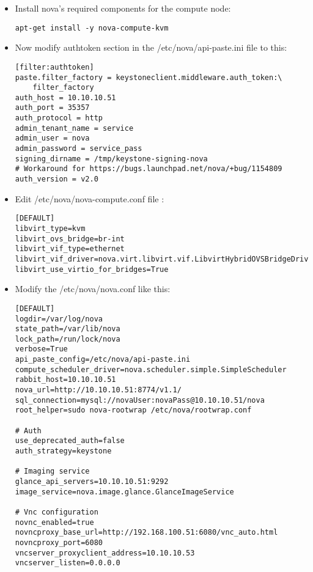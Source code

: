 \begin{itemize}
\item Install nova's required components for the compute node:

\begin{verbatim}
apt-get install -y nova-compute-kvm
\end{verbatim}


\item Now modify authtoken section in the \slash etc\slash nova\slash api-paste.ini file to this:

\begin{verbatim}
[filter:authtoken]
paste.filter_factory = keystoneclient.middleware.auth_token:\
    filter_factory
auth_host = 10.10.10.51
auth_port = 35357
auth_protocol = http
admin_tenant_name = service
admin_user = nova
admin_password = service_pass
signing_dirname = /tmp/keystone-signing-nova
# Workaround for https://bugs.launchpad.net/nova/+bug/1154809
auth_version = v2.0
\end{verbatim}


\item Edit \slash etc\slash nova\slash nova-compute.conf file :

\begin{verbatim}
[DEFAULT]
libvirt_type=kvm
libvirt_ovs_bridge=br-int
libvirt_vif_type=ethernet
libvirt_vif_driver=nova.virt.libvirt.vif.LibvirtHybridOVSBridgeDriver
libvirt_use_virtio_for_bridges=True
\end{verbatim}


\item Modify the \slash etc\slash nova\slash nova.conf like this:

\begin{verbatim}
[DEFAULT] 
logdir=/var/log/nova
state_path=/var/lib/nova
lock_path=/run/lock/nova
verbose=True
api_paste_config=/etc/nova/api-paste.ini
compute_scheduler_driver=nova.scheduler.simple.SimpleScheduler
rabbit_host=10.10.10.51
nova_url=http://10.10.10.51:8774/v1.1/
sql_connection=mysql://novaUser:novaPass@10.10.10.51/nova
root_helper=sudo nova-rootwrap /etc/nova/rootwrap.conf

# Auth
use_deprecated_auth=false
auth_strategy=keystone

# Imaging service
glance_api_servers=10.10.10.51:9292
image_service=nova.image.glance.GlanceImageService

# Vnc configuration
novnc_enabled=true
novncproxy_base_url=http://192.168.100.51:6080/vnc_auto.html
novncproxy_port=6080
vncserver_proxyclient_address=10.10.10.53
vncserver_listen=0.0.0.0


\end{verbatim}
\end{itemize}
